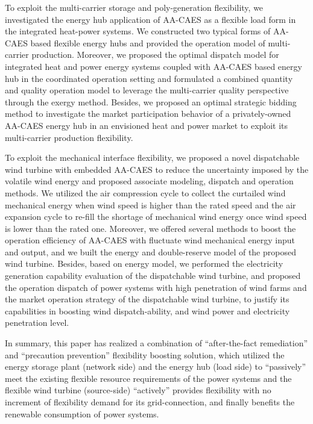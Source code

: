 \begin{eabstract}
To exploit the multi-carrier storage and poly-generation flexibility, we investigated the energy hub application of AA-CAES as a flexible load form in the integrated heat-power systems. We constructed two typical forms of AA-CAES based flexible energy hubs and provided the operation model of multi-carrier production. Moreover, we proposed the optimal dispatch model for integrated heat and power energy systems coupled with AA-CAES based energy hub in the coordinated operation setting and formulated a combined quantity and quality operation model to leverage the multi-carrier quality perspective through the exergy method. Besides, we proposed an optimal strategic bidding method to investigate the market participation behavior of a privately-owned AA-CAES energy hub in an envisioned heat and power market to exploit its multi-carrier production flexibility.

To exploit the mechanical interface flexibility, we proposed a novel dispatchable wind turbine with embedded AA-CAES to reduce the uncertainty imposed by the volatile wind energy and proposed associate modeling, dispatch and operation methods. We utilized the air compression cycle to collect the curtailed wind mechanical energy when wind speed is higher than the rated speed and the air expansion cycle to re-fill the shortage of mechanical wind energy once wind speed is lower than the rated one. Moreover, we offered several methods to boost the operation efficiency of AA-CAES with fluctuate wind mechanical energy input and output, and we built the energy and double-reserve model of the proposed wind turbine. Besides, based on energy model, we performed the electricity generation capability evaluation of the dispatchable wind turbine, and proposed the operation dispatch of power systems with high penetration of wind farms and the market operation strategy of the dispatchable wind turbine, to justify its capabilities in boosting wind dispatch-ability, and wind power and electricity penetration level. 

In summary, this paper has realized a combination of “after-the-fact remediation” and “precaution prevention” flexibility boosting solution, which utilized the energy storage plant (network side) and the energy hub (load side) to “passively” meet the existing flexible resource requirements of the power systems and the flexible wind turbine (source-side) “actively” provides flexibility with no increment of flexibility demand for its grid-connection, and finally benefits the renewable consumption of power systems.
\end{eabstract}

